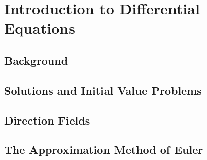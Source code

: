 \documentclass[../diffeq.tex]{subfiles}
\begin{document}
\chapter{Introduction to Differential Equations}
\section{Background}
\section{Solutions and Initial Value Problems}
\section{Direction Fields}
\section{The Approximation Method of Euler}
\end{document}
